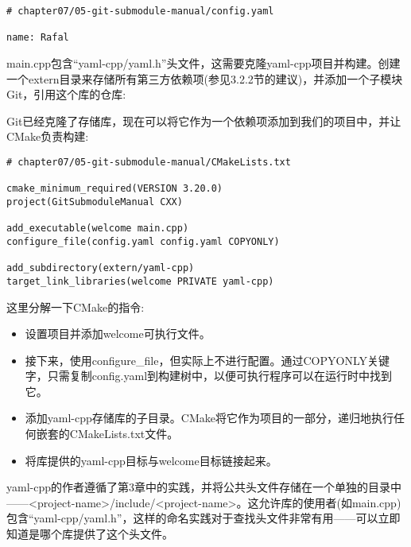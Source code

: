 \begin{lstlisting}[style=styleCMake]
# chapter07/05-git-submodule-manual/config.yaml

name: Rafal
\end{lstlisting}

main.cpp包含“yaml-cpp/yaml.h”头文件，这需要克隆yaml-cpp项目并构建。创建一个extern目录来存储所有第三方依赖项(参见3.2.2节的建议)，并添加一个子模块Git，引用这个库的仓库:


Git已经克隆了存储库，现在可以将它作为一个依赖项添加到我们的项目中，并让CMake负责构建:

\begin{lstlisting}[style=styleCMake]
# chapter07/05-git-submodule-manual/CMakeLists.txt

cmake_minimum_required(VERSION 3.20.0)
project(GitSubmoduleManual CXX)

add_executable(welcome main.cpp)
configure_file(config.yaml config.yaml COPYONLY)

add_subdirectory(extern/yaml-cpp)
target_link_libraries(welcome PRIVATE yaml-cpp)
\end{lstlisting}

这里分解一下CMake的指令:

\begin{itemize}
\item 
设置项目并添加welcome可执行文件。

\item 
接下来，使用configure\_file，但实际上不进行配置。通过COPYONLY关键字，只需复制config.yaml到构建树中，以便可执行程序可以在运行时中找到它。

\item 
添加yaml-cpp存储库的子目录。CMake将它作为项目的一部分，递归地执行任何嵌套的CMakeLists.txt文件。

\item 
将库提供的yaml-cpp目标与welcome目标链接起来。
\end{itemize}

yaml-cpp的作者遵循了第3章中的实践，并将公共头文件存储在一个单独的目录中——<project-name>/include/<project-name>。这允许库的使用者(如main.cpp)包含“yaml-cpp/yaml.h”，这样的命名实践对于查找头文件非常有用——可以立即知道是哪个库提供了这个头文件。

